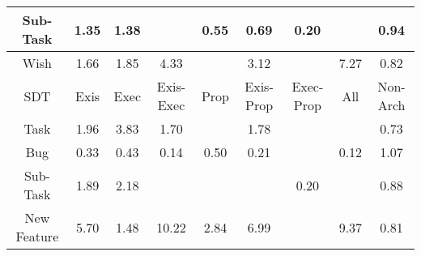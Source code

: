 \begin{tabular}{|c||c|c|c|c|c|c|c|c|}
\hline
Sub-Task & \cellcolor[rgb]{0.902916253977175,0.8366445413576091,0.42} 1.35 & \cellcolor[rgb]{0.9022753094110388,0.8363409360368078,0.42} 1.38 &  & \cellcolor[rgb]{0.8410816464809647,0.5137864600098992,0.35567620338223366} 0.55 & \cellcolor[rgb]{0.8622437067904934,0.6139535454750022,0.37542745967112723} 0.69 & \cellcolor[rgb]{0.7887119104932475,0.26590304300137185,0.3067977831270311} 0.20 &  & \cellcolor[rgb]{0.9015608597071941,0.8000547359473853,0.41212346906004776} 0.94 \\ 
\hline
Wish & \cellcolor[rgb]{0.896776495874571,0.8337362348879546,0.42} 1.66 & \cellcolor[rgb]{0.8929701987728296,0.8319332520502877,0.42} 1.85 & \cellcolor[rgb]{0.8431688689894254,0.808343148468675,0.42} 4.33 &  & \cellcolor[rgb]{0.8674630642855312,0.819850925187883,0.42} 3.12 &  & \cellcolor[rgb]{0.7840632303485482,0.7803457406914175,0.41999999999999993} 7.27 & \cellcolor[rgb]{0.8824424180775948,0.709560778900615,0.39427959020575504} 0.82 \\ 
\hline
\hline
SDT & Exis & Exec & Exis-Exec & Prop & Exis-Prop & Exec-Prop & All & Non-Arch \\ 
\hline
Task & \cellcolor[rgb]{0.8907862709267947,0.8308987599126922,0.42} 1.96 & \cellcolor[rgb]{0.8531871591819102,0.8130886543493259,0.42} 3.83 & \cellcolor[rgb]{0.8958538526742043,0.8332991933719915,0.42} 1.70 &  & \cellcolor[rgb]{0.894360130677061,0.8325916408470289,0.42} 1.78 &  &  & \cellcolor[rgb]{0.8684734814412828,0.6434411454887384,0.38124191601186397} 0.73 \\ 
\hline
Bug & \cellcolor[rgb]{0.8082497543267062,0.35838217047974286,0.32503310403825914} 0.33 & \cellcolor[rgb]{0.8234231406294243,0.4302028656459419,0.33919493125412936} 0.43 & \cellcolor[rgb]{0.779091756591736,0.2203676478675507,0.2978189728189537} 0.14 & \cellcolor[rgb]{0.833921915072386,0.47989706467596066,0.34899378740089365} 0.50 & \cellcolor[rgb]{0.7889305808297394,0.2669380825940999,0.30700187544109014} 0.21 &  & \cellcolor[rgb]{0.7764601566646581,0.2079114082127146,0.29536281288701416} 0.12 & \cellcolor[rgb]{0.9085938180179483,0.8393339137979755,0.42} 1.07 \\ 
\hline
Sub-Task & \cellcolor[rgb]{0.8920426849725266,0.8314939034080389,0.42} 1.89 & \cellcolor[rgb]{0.8862465896582212,0.8287483845749468,0.42} 2.18 &  &  &  & \cellcolor[rgb]{0.7874531172498433,0.25994475498259206,0.3056229094331872} 0.20 &  & \cellcolor[rgb]{0.8913588449026213,0.7517651992057404,0.4026015885757798} 0.88 \\ 
\hline
New Feature & \cellcolor[rgb]{0.8155746026748638,0.7952721802144092,0.42} 5.70 & \cellcolor[rgb]{0.9002647654309737,0.8353885730988823,0.42} 1.48 & \cellcolor[rgb]{0.724869420833188,0.752306567763089,0.42} 10.22 & \cellcolor[rgb]{0.8731289461370173,0.8225347639596398,0.42} 2.84 & \cellcolor[rgb]{0.7896465289157741,0.7829904610653666,0.41999999999999993} 6.99 &  & \cellcolor[rgb]{0.7419024040166685,0.760374822955264,0.42} 9.37 & \cellcolor[rgb]{0.8810213343713658,0.7028343160244644,0.3929532454132747} 0.81 \\ 

\end{tabular}
